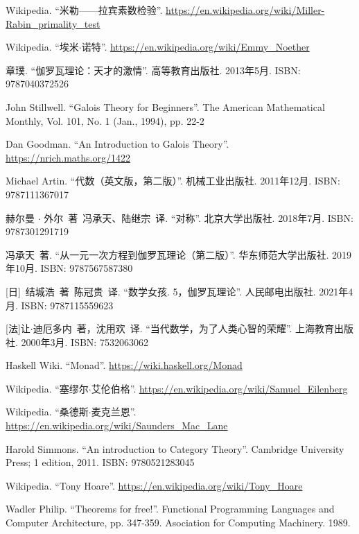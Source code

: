 \documentclass[UTF8]{article}
\begin{document}
\begin{thebibliography}{99}
Wikipedia. ``米勒——拉宾素数检验''. \url{https://en.wikipedia.org/wiki/Miller-Rabin_primality_test}

Wikipedia. ``埃米$\cdot$诺特''. \url{https://en.wikipedia.org/wiki/Emmy_Noether}

章璞. ``伽罗瓦理论：天才的激情''. 高等教育出版社. 2013年5月. ISBN: 9787040372526

John Stillwell. ``Galois Theory for Beginners''. The American Mathematical Monthly, Vol. 101, No. 1 (Jan., 1994), pp. 22-2

Dan Goodman. ``An Introduction to Galois Theory''. \url{https://nrich.maths.org/1422}

Michael Artin. ``代数（英文版，第二版）''. 机械工业出版社. 2011年12月. ISBN: 9787111367017

赫尔曼 $\cdot$ 外尔\ 著\ 冯承天、陆继宗\ 译. ``对称''. 北京大学出版社. 2018年7月. ISBN: 9787301291719

冯承天\ 著. ``从一元一次方程到伽罗瓦理论（第二版）''. 华东师范大学出版社. 2019年10月. ISBN: 9787567587380

[日]\ 结城浩\ 著\ 陈冠贵\ 译. ``数学女孩. 5，伽罗瓦理论''. 人民邮电出版社. 2021年4月. ISBN: 9787115559623


[法]让$\cdot$迪厄多内\ 著，沈用欢\ 译. ``当代数学，为了人类心智的荣耀''. 上海教育出版社. 2000年3月. ISBN: 7532063062

Haskell Wiki. ``Monad''. \url{https://wiki.haskell.org/Monad}

Wikipedia. ``塞缪尔$\cdot$艾伦伯格''. \url{https://en.wikipedia.org/wiki/Samuel_Eilenberg}

Wikipedia. ``桑德斯$\cdot$麦克兰恩''. \url{https://en.wikipedia.org/wiki/Saunders_Mac_Lane}

Harold Simmons. ``An introduction to Category Theory''.  Cambridge University Press; 1 edition, 2011. ISBN: 9780521283045

Wikipedia. ``Tony Hoare''. \url{https://en.wikipedia.org/wiki/Tony_Hoare}

Wadler Philip. ``Theorems for free!''. Functional Programming Languages and Computer Architecture, pp. 347-359. Asociation for Computing Machinery. 1989.


\end{thebibliography}
\end{document}
